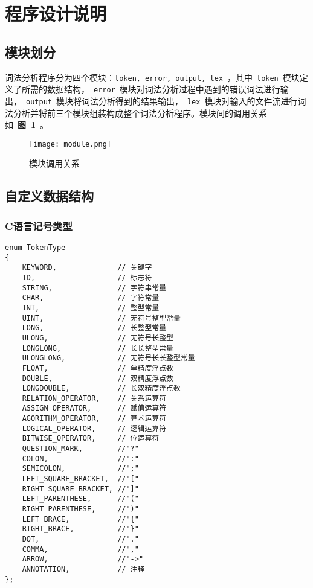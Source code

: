 \documentclass[lang=cn,11pt,a4paper]{paper}
\begin{document}
\section{程序设计说明}

\subsection{模块划分}

词法分析程序分为四个模块：\lstinline{token, error, output, lex}\ ，其中\ \lstinline{token}\ 模块定义了所需的数据结构，\ \lstinline{error}\ 模块对词法分析过程中遇到的错误词法进行输出，\ \lstinline{output}\ 模块将词法分析得到的结果输出，\ \lstinline{lex}\ 模块对输入的文件流进行词法分析并将前三个模块组装构成整个词法分析程序。模块间的调用关系如\ \textbf{图\ \ref{fig:模块调用关系}}\ 。

\begin{figure}[!htb]
    \centering
    \texttt{[image: module.png]}
    \caption{模块调用关系}
    \label{fig:模块调用关系}
\end{figure}

\subsection{自定义数据结构}

\subsubsection{C语言记号类型}

\begin{lstlisting}
enum TokenType
{
    KEYWORD,              // 关键字
    ID,                   // 标志符
    STRING,               // 字符串常量
    CHAR,                 // 字符常量
    INT,                  // 整型常量
    UINT,                 // 无符号整型常量
    LONG,                 // 长整型常量
    ULONG,                // 无符号长整型
    LONGLONG,             // 长长整型常量
    ULONGLONG,            // 无符号长长整型常量
    FLOAT,                // 单精度浮点数
    DOUBLE,               // 双精度浮点数
    LONGDOUBLE,           // 长双精度浮点数
    RELATION_OPERATOR,    // 关系运算符
    ASSIGN_OPERATOR,      // 赋值运算符
    AGORITHM_OPERATOR,    // 算术运算符
    LOGICAL_OPERATOR,     // 逻辑运算符
    BITWISE_OPERATOR,     // 位运算符
    QUESTION_MARK,        //"?"
    COLON,                //":"
    SEMICOLON,            //";"
    LEFT_SQUARE_BRACKET,  //"["
    RIGHT_SQUARE_BRACKET, //"]"
    LEFT_PARENTHESE,      //"("
    RIGHT_PARENTHESE,     //")"
    LEFT_BRACE,           //"{"
    RIGHT_BRACE,          //"}"
    DOT,                  //"."
    COMMA,                //","
    ARROW,                //"->"
    ANNOTATION,           // 注释
};
\end{lstlisting}
\end{document}

